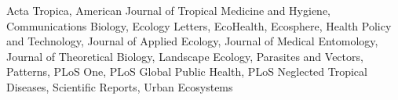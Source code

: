 
Acta Tropica, American Journal of Tropical Medicine and Hygiene, Communications Biology, Ecology Letters, EcoHealth, Ecosphere, Health Policy and Technology, Journal of Applied Ecology, Journal of Medical Entomology, Journal of Theoretical Biology, Landscape Ecology, Parasites and Vectors, Patterns, PLoS One, PLoS Global Public Health, PLoS Neglected Tropical Diseases, Scientific Reports, Urban Ecosystems
